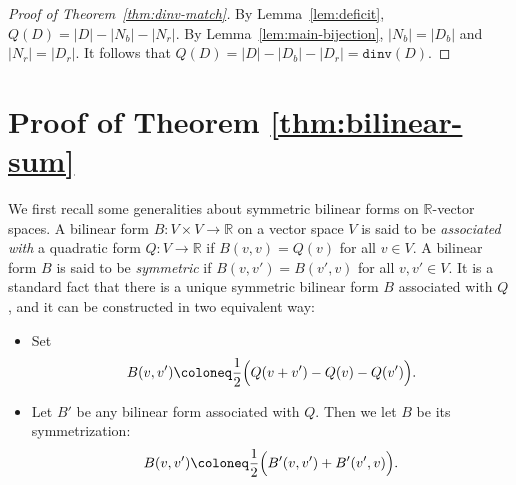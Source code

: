 \documentclass[11pt,reqno]{amsart}
\theoremstyle{remark}
\begin{document}
\begin{proof}[Proof of Theorem~\ref{thm:dinv-match}]
By Lemma~\ref{lem:deficit}, $Q(D)=|D|-|N_b|-|N_r|$. By Lemma~\ref{lem:main-bijection}, $|N_b|=|D_b|$ and $|N_r|=|D_r|$. It follows that $Q(D) = |D|-|D_b|-|D_r| = \mathtt{dinv}(D)$.
\end{proof}


\section{Proof of Theorem \ref{thm:bilinear-sum}}\label{sec:bilinear-sum}
We first recall some generalities about symmetric bilinear forms on $\mathbb{R}$-vector spaces. A bilinear form $B:V\times V\to \mathbb{R}$ on a vector space $V$ is said to be \emph{associated with} a quadratic form $Q:V\to \mathbb{R}$ if $B(v,v)=Q(v)$ for all $v\in V$. A bilinear form $B$ is said to be \emph{symmetric} if $B(v,v')=B(v',v)$ for all $v,v'\in V$. It is a standard fact that there is a unique symmetric bilinear form $B$ associated with $Q$, and it can be constructed in two equivalent way:
\begin{itemize}
    \item Set 
    \[ B(v,v')\coloneq \frac{1}{2}\Bigl(Q(v+v')-Q(v)-Q(v')\Bigr).\]
    \item Let $B'$ be any bilinear form associated with $Q$. Then we let $B$ be its symmetrization:
    \[ B(v,v')\coloneq \frac{1}{2}\Bigl(B'(v,v')+B'(v',v)\Bigr).\]
\end{itemize}
\end{document}
